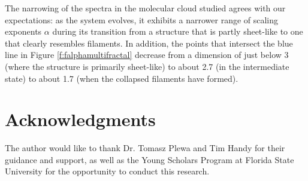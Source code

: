 \documentclass[iop]{emulateapj}
\begin{document}
The narrowing of the spectra in the molecular cloud studied agrees with our expectations: as the system evolves, it exhibits a narrower range of scaling exponents $ \alpha $ during its transition from a structure that is partly sheet-like to one that clearly resembles filaments. In addition, the points that intersect the blue line in Figure \ref{f:falphamultifractal} decrease from a dimension of just below 3 (where the structure is primarily sheet-like) to about 2.7 (in the intermediate state) to about 1.7 (when the collapsed filaments have formed).

\section{Acknowledgments}\label{s:ack}
The author would like to thank Dr. Tomasz Plewa and Tim Handy for their guidance and support, as well as the Young Scholars Program at Florida State University for the opportunity to conduct this research.
%
%


%
%
%
\end{document}
